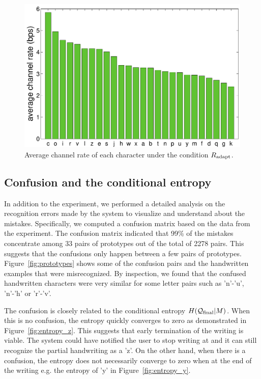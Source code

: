 \documentclass{sigchi}
\begin{document}
\begin{figure}
  \centering
  \includegraphics[width=0.9\columnwidth]{figures/histogram_channel_rate.pdf}
  \caption{Average channel rate of each character under the condition $R_{\mathrm{adapt}}$.}
  \label{fig:histogram_english_rate} 
\end{figure}


\subsection{Confusion and the conditional entropy}

In addition to the experiment, we performed a detailed analysis on the
recognition errors made by the system to visualize and understand
about the mistakes. Specifically, we computed a confusion matrix based
on the data from the experiment. The confusion matrix indicated that
99\% of the mistakes concentrate among 33 pairs of prototypes out of
the total of 2278 pairs. This suggests that the confusions only happen
between a few pairs of prototypes. Figure~\ref{fig:prototypes} shows
some of the confusion pairs and the handwritten examples that were
misrecognized. By inspection, we found that the confused handwritten
characters were very similar for some letter pairs such as 'n'-'u',
'n'-'h' or 'r'-'v'.

The confusion is closely related to the conditional entropy
$H(\mathcal{Q}_{\mathrm{final}} | M)$. When this is no confusion, the entropy quickly
converges to zero as demonstrated in Figure~\ref{fig:entropy_z}. This
suggests that early termination of the writing is viable. The system
could have notified the user to stop writing at  and it can
still recognize the partial handwriting as a 'z'. On the other hand,
when there is a confusion, the entropy does not necessarily converge
to zero when at the end of the writing e.g. the entropy of 'y' in
Figure~\ref{fig:entropy_y}.
\end{document}
